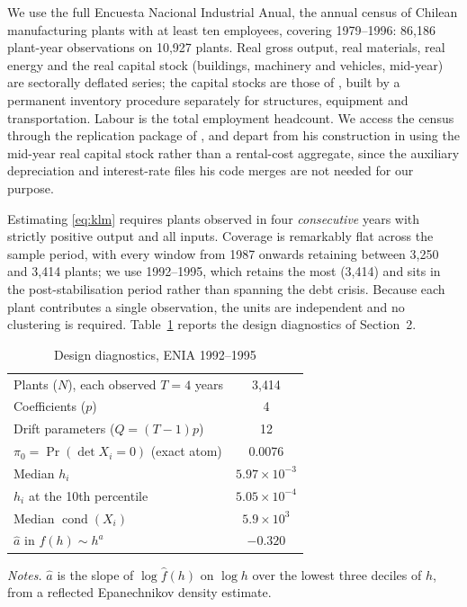 We use the full Encuesta Nacional Industrial Anual, the annual census of
Chilean manufacturing plants with at least ten employees, covering 1979--1996:
86{,}186 plant-year observations on 10{,}927 plants. Real gross output, real
materials, real energy and the real capital stock (buildings, machinery and
vehicles, mid-year) are sectorally deflated series; the capital stocks are
those of \citet{Greenstreet2007}, built by a permanent inventory procedure
separately for structures, equipment and transportation. Labour is the total
employment headcount. We access the census through the replication package of
\citet{Raval2023}, and depart from his construction in using the mid-year real
capital stock rather than a rental-cost aggregate, since the auxiliary
depreciation and interest-rate files his code merges are not needed for our
purpose.

Estimating \eqref{eq:klm} requires plants observed in four \emph{consecutive}
years with strictly positive output and all inputs. Coverage is remarkably flat
across the sample period, with every window from 1987 onwards retaining between
3{,}250 and 3{,}414 plants; we use 1992--1995, which retains the most
(3{,}414) and sits in the post-stabilisation period rather than spanning the
debt crisis. Because each plant contributes a single observation, the units are
independent and no clustering is required. Table~\ref{tab:design} reports the
design diagnostics of Section~2.

\begin{table}[t]
\centering
\caption{Design diagnostics, ENIA 1992--1995}
\label{tab:design}
\begin{tabular}{lc}
\toprule
Plants ($N$), each observed $T = 4$ years        & 3{,}414 \\
Coefficients ($p$)                               & 4 \\
Drift parameters ($Q = (T-1)p$)                  & 12 \\
$\pi_0 = \Pr(\det X_i = 0)$ (exact atom)         & 0.0076 \\
Median $h_i$                                     & $5.97 \times 10^{-3}$ \\
$h_i$ at the 10th percentile                     & $5.05 \times 10^{-4}$ \\
Median $\operatorname{cond}(X_i)$                & $5.9 \times 10^{3}$ \\
$\hat a$ in $f(h) \sim h^{a}$                    & $-0.320$ \\
\bottomrule
\end{tabular}

\vspace{0.6em}
\begin{minipage}{0.92\textwidth}
\footnotesize \emph{Notes.} $\hat a$ is the slope of $\log \hat f(h)$ on
$\log h$ over the lowest three deciles of $h$, from a reflected Epanechnikov
density estimate.
\end{minipage}
\end{table}

